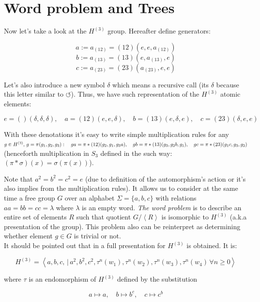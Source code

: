 \documentclass[a4paper,12pt]{amsart}
\begin{document}
\section{Word problem and Trees}

Now let's take a look at the $H^{(3)}$ group. Hereafter define generators:  

$$ a := a_{(12)} = (1 2) (e, e, a_{(12)}) $$
$$ b := a_{(13)} = (1 3) (e, a_{(13)}, e) $$
$$ c := a_{(23)} = (2 3) (a_{(23)}, e, e) $$

Let's also introduce a new symbol $\delta$ which means a recursive call (its $\delta$ because 
this letter similar to $\circlearrowleft$). Thus, we
have such representation of the $H^{(3)}$ atomic elements:

$$ e = () (\delta, \delta, \delta), \quad a = (1 2) (e, e, \delta), \quad 
b = (1 3)(e, \delta, e), \quad c = (2 3)(\delta, e, e)$$

With these denotations it's easy to write simple multiplication rules for any 
$g \in H^{(3)}, \, g = \pi (g_1, g_2, g_3):\\ \quad g a = \pi * (12) (g_2, g_1, g_3a), \quad  
g b = \pi* (13) (g_3, g_2b, g_1), \quad g c = \pi * (23) (g_1c, g_3, g_2)$ (henceforth multiplication 
in $S_3$ defined in the such way: $(\pi * \sigma) (x) = \sigma(\pi(x))$).

Note that $a^2 = b^2 = c^2 = e$ (due to definition of the automorphism's action or 
it's also implies from the multiplication rules). It allows us to consider at the same 
time a free group $G$ over an alphabet $\Sigma = \{a, b, c\}$ with relations 
$aa = bb = cc = \lambda$ where $\lambda$ is an empty word. 
\textit{The word problem} is to describe an entire set of elements $R$ 
such that quotient $G / \left\langle R \right\rangle$ is isomorphic to $H^{(3)}$ 
(a.k.a presentation of the group). This problem also can be reinterpret 
as determining whether element $g \in G$ is trivial or not.
\\

It should be pointed out that in \cite{HRepr} a full presentation for $H^{(3)}$ is obtained. It is: 

$$ H^{(3)} = \left\langle 
	a, b, c,\, |\, a^2, b^2, c^2, \tau^n(w_1), \tau^n(w_2), \tau^n(w_3), \tau^n(w_4) \, \forall n \ge 0
\right\rangle $$

where $\tau$ is an endomorphism of $H^{(3)}$ defined by the substitution

$$ a \mapsto a, \quad b \mapsto b^c, \quad c \mapsto c^b$$
\end{document}
